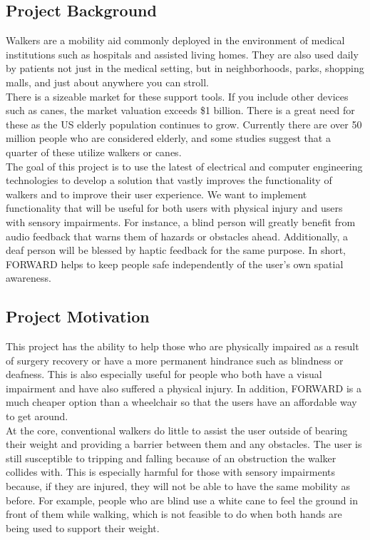 \subsection{Project Background}
\indent Walkers are a mobility aid commonly deployed in the environment of medical institutions such as hospitals and assisted living homes. They are also used daily by patients not just in the medical setting, but in neighborhoods, parks, shopping malls, and just about anywhere you can stroll. 
\\

\noindent There is a sizeable market for these support tools. If you include other devices such as canes, the market valuation exceeds \$1 billion. There is a great need for these as the US elderly population continues to grow. Currently there are over 50 million people who are considered elderly, and some studies suggest that a quarter of these utilize walkers or canes. 
\\

\noindent The goal of this project is to use the latest of electrical and computer engineering technologies to develop a solution that vastly improves the functionality of walkers and to improve their user experience. We want to implement functionality that will be useful for both users with physical injury and users with sensory impairments. For instance, a blind person will greatly benefit from audio feedback that warns them of hazards or obstacles ahead. Additionally, a deaf person will be blessed by haptic feedback for the same purpose. In short, FORWARD helps to keep people safe independently of the user’s own spatial awareness.

\subsection{Project Motivation}
\indent This project has the ability to help those who are physically impaired as a result of surgery recovery or have a more permanent hindrance such as blindness or deafness. This is also especially useful for people who both have a visual impairment and have also suffered a physical injury. In addition, FORWARD is a much cheaper option than a wheelchair so that the users have an affordable way to get around. 
\\

\noindent At the core, conventional walkers do little to assist the user outside of bearing their weight and providing a barrier between them and any obstacles. The user is still susceptible to tripping and falling because of an obstruction the walker collides with. This is especially harmful for those with sensory impairments because, if they are injured, they will not be able to have the same mobility as before. For example, people who are blind use a white cane to feel the ground in front of them while walking, which is not feasible to do when both hands are being used to support their weight. 
\\


